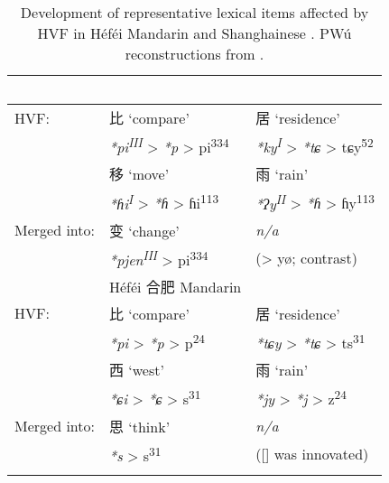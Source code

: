\documentclass[output=paper,hidelinks]{langscibook}
\begin{document}
\begin{table}
\caption{Development of representative lexical items affected by HVF in H\'ef\'ei Mandarin \citep{wu-hefei} and Shanghainese \citep{qian}. PWú reconstructions from \citet{ballard}.}
\label{merger-table}
	\begin{tabular}{l l l}
 	\lsptoprule
	~ & \ili{Shanghainese} & ~ \\
	\midrule
	HVF: & {\cjkfont 比} `compare' & {\cjkfont 居} `residence' \\
	~ & \textit{*pi\textsuperscript{III}} > \textit{*p\iz{}} > pi\textsuperscript{334} & \textit{*ky\textsuperscript{I}} > \textit{*tɕ\yz{}} > tɕy\textsuperscript{52} \\
	\midrule
	~ & {\cjkfont 移} `move'  & {\cjkfont 雨} `rain' \\
	~ & \textit{*ɦi\textsuperscript{I}} > \textit{*ɦ\iz{}} > ɦi\textsuperscript{113} & \textit{*ʔy\textsuperscript{II}} > \textit{*ɦ\yz{}} > ɦy\textsuperscript{113} \\
	\midrule
	Merged into: & {\cjkfont 变} `change' & \textit{n/a} \\ %
	~& \textit{*pjen\textsuperscript{III}} > pi\textsuperscript{334} & (\pryen > yø; contrast) \\ %
	\midrule
	~ & Héféi\il{Héféi Mandarin} {\cjkfont 合肥} Mandarin & ~ \\
	\midrule
	HVF: & {\cjkfont 比} `compare' & {\cjkfont 居} `residence' \\
	~ & \textit{*pi} > \textit{*p\iz{}} > p\zz{}\textsuperscript{24} & \textit{*tɕy} > \textit{*tɕ\yz{}} > ts\zw{}\textsuperscript{31} \\
	\midrule
	~ & {\cjkfont 西} `west' & {\cjkfont 雨} `rain'  \\
	~ & \textit{*ɕi} > \textit{*ɕ\iz{}} > s\zz{}\textsuperscript{31} & \textit{*jy} > \textit{*j\yz{}} > z\zw{}\textsuperscript{24} \\
	\midrule
	Merged into: & {\cjkfont 思} `think' & \textit{n/a} \\
	~ & \textit{*s\zz{}} > s\zz{}\textsuperscript{31} & ([\zw] was innovated) \\
	\lspbottomrule
	\end{tabular}
\end{table}


\end{document}
